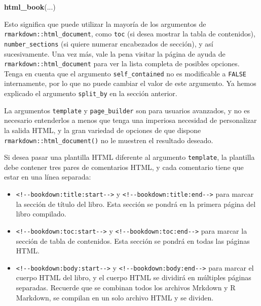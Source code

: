 \documentclass[12pt,]{krantz}
\makeatletter
\newenvironment{Shaded}{\begin{snugshade}}{\end{snugshade}}
\newcommand{\KeywordTok}[1]{\textcolor[rgb]{0.13,0.29,0.53}{\textbf{{#1}}}}
\newcommand{\NormalTok}[1]{{#1}}
\providecommand{\tightlist}{%
  \setlength{\itemsep}{0pt}\setlength{\parskip}{0pt}}
\newenvironment{kframe}{%
\medskip{}
\setlength{\fboxsep}{.8em}
 \def\at@end@of@kframe{}%
 \ifinner\ifhmode%
  \def\at@end@of@kframe{\end{minipage}}%
  \begin{minipage}{\columnwidth}%
 \fi\fi%
 \def\FrameCommand##1{\hskip\@totalleftmargin \hskip-\fboxsep
 \colorbox{shadecolor}{##1}\hskip-\fboxsep
     \hskip-\linewidth \hskip-\@totalleftmargin \hskip\columnwidth}%
 \MakeFramed {\advance\hsize-\width
   \@totalleftmargin\z@ \linewidth\hsize
   \@setminipage}}%
 {\par\unskip\endMakeFramed%
 \at@end@of@kframe}
\renewenvironment{Shaded}{\begin{kframe}}{\end{kframe}}
\theoremstyle{definition}
\theoremstyle{definition}
\theoremstyle{remark}
\makeatother
\begin{document}
\begin{Shaded}
\begin{Highlighting}[]
\KeywordTok{html_book}\NormalTok{(...)}
\end{Highlighting}
\end{Shaded}

Esto significa que puede utilizar la mayoría de los argumentos de
\texttt{rmarkdown::html\_document}, como \texttt{toc} (si desea mostrar
la tabla de contenidos), \texttt{number\_sections} (si quiere numerar
encabezados de sección), y así sucesivamente. Una vez más, vale la pena
visitar la página de ayuda de \texttt{rmarkdown::html\_document} para
ver la lista completa de posibles opciones. Tenga en cuenta que el
argumento \texttt{self\_contained} no es modificable a \texttt{FALSE}
internamente, por lo que no puede cambiar el valor de este argumento. Ya
hemos explicado el argumento \texttt{split\_by} en la sección anterior.

La argumentos \texttt{template} y \texttt{page\_builder} son para
usuarios avanzados, y no es necesario entenderlos a menos que tenga una
imperiosa necesidad de personalizar la salida HTML, y la gran variedad
de opciones de que dispone \texttt{rmarkdown::html\_document()} no le
muestren el resultado deseado.

Si desea pasar una plantilla HTML diferente al argumento
\texttt{template}, la plantilla debe contener tres pares de comentarios
HTML, y cada comentario tiene que estar en una línea separada:

\begin{itemize}
\tightlist
\item
  \texttt{\textless{}!-\/-bookdown:title:start-\/-\textgreater{}} y
  \texttt{\textless{}!-\/-bookdown:title:end-\/-\textgreater{}} para
  marcar la sección de título del libro. Esta sección se pondrá en la
  primera página del libro compilado.
\item
  \texttt{\textless{}!-\/-bookdown:toc:start-\/-\textgreater{}} y
  \texttt{\textless{}!-\/-bookdown:toc:end-\/-\textgreater{}} para
  marcar la sección de tabla de contenidos. Esta sección se pondrá en
  todas las páginas HTML.
\item
  \texttt{\textless{}!-\/-bookdown:body:start-\/-\textgreater{}} y
  \texttt{\textless{}!-\/-bookdown:body:end-\/-\textgreater{}} para
  marcar el cuerpo HTML del libro, y el cuerpo HTML se dividirá en
  múltiples páginas separadas. Recuerde que se combinan todos los
  archivos Mrkdown y R Markdown, se compilan en un solo archivo HTML y
  se dividen.
\end{itemize}
\end{document}
